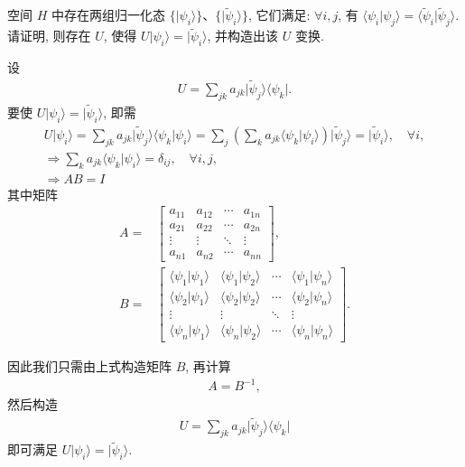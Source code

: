 \documentclass{assignment}
\begin{document}
\begin{prob}
    空间 $H$ 中存在两组归一化态 $\{\lvert\psi_i\rangle\}$、$\{\lvert\tilde{\psi}_i\rangle\}$, 它们满足: $\forall i,j$, 有 $\langle\psi_i\vert\psi_j\rangle=\langle\tilde{\psi}_i\vert\tilde{\psi}_j\rangle$. 请证明, 则存在 $U$, 使得 $U\lvert\psi_i\rangle=\lvert\tilde{\psi}_i\rangle$, 并构造出该 $U$ 变换.
\end{prob}
\begin{sol}
    设
    \begin{align}
        U=\sum_{jk}a_{jk}\lvert\tilde{\psi}_j\rangle\langle\psi_k\rvert.
    \end{align}
    要使 $U\lvert\psi_i\rangle=\lvert\tilde{\psi}_i\rangle$, 即需
    \begin{gather}
        U\lvert\psi_i\rangle=\sum_{jk}a_{jk}\lvert\tilde{\psi}_j\rangle\langle\psi_k\vert\psi_i\rangle=\sum_j\left(\sum_ka_{jk}\langle\psi_k\vert\psi_i\rangle\right)\lvert\tilde{\psi}_j\rangle=\lvert\tilde{\psi}_i\rangle,\quad\forall i,\\
        \Longrightarrow\sum_ka_{jk}\langle\psi_k\vert\psi_i\rangle=\delta_{ij},\quad\forall i,j,\\
        \Longrightarrow AB=I
    \end{gather}
    其中矩阵
    \begin{align}
        A=&\begin{bmatrix}
            a_{11}&a_{12}&\cdots&a_{1n}\\
            a_{21}&a_{22}&\cdots&a_{2n}\\
            \vdots&\vdots&\ddots&\vdots\\
            a_{n1}&a_{n2}&\cdots&a_{nn}
        \end{bmatrix},\\
        B=&\begin{bmatrix}
            \langle\psi_1\vert\psi_1\rangle&\langle\psi_1\vert\psi_2\rangle&\cdots&\langle\psi_1\vert\psi_n\rangle\\
            \langle\psi_2\vert\psi_1\rangle&\langle\psi_2\vert\psi_2\rangle&\cdots&\langle\psi_2\vert\psi_n\rangle\\
            \vdots&\vdots&\ddots&\vdots\\
            \langle\psi_n\vert\psi_1\rangle&\langle\psi_n\vert\psi_2\rangle&\cdots&\langle\psi_n\vert\psi_n\rangle
        \end{bmatrix}.
    \end{align}

    因此我们只需由上式构造矩阵 $B$, 再计算
    \begin{align}
        A=B^{-1},
    \end{align}
    然后构造
    \begin{align}
        U=\sum_{jk}a_{jk}\lvert\tilde{\psi}_j\rangle\langle\psi_k\rvert
    \end{align}
    即可满足 $U\lvert\psi_i\rangle=\lvert\tilde{\psi}_i\rangle$.
\end{sol}
\end{document}
